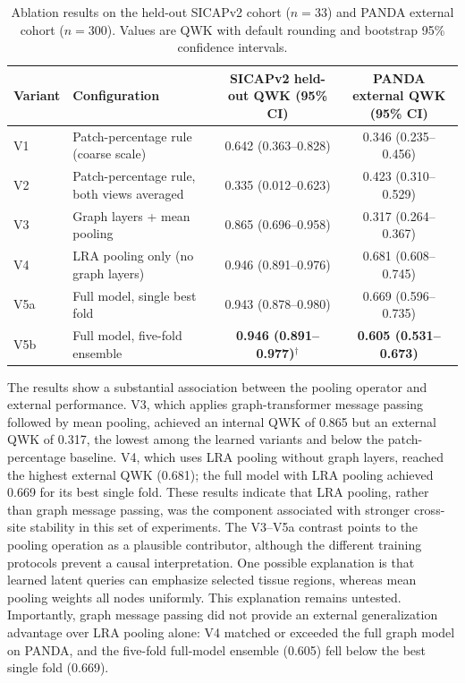 \documentclass[11pt,a4paper]{article}
\begin{document}
\begin{table}[H]
\centering
\small
\renewcommand{\arraystretch}{1.15}
\caption{Ablation results on the held-out SICAPv2 cohort ($n = 33$) and PANDA external cohort ($n = 300$). Values are QWK with default rounding and bootstrap 95\% confidence intervals.}
\label{tab:ablation}
\begin{tabularx}{\textwidth}{lXcc}
\toprule
\textbf{Variant} & \textbf{Configuration} & \textbf{SICAPv2 held-out QWK (95\% CI)} & \textbf{PANDA external QWK (95\% CI)} \\
\midrule
V1 & Patch-percentage rule (coarse scale) & 0.642 (0.363--0.828) & 0.346 (0.235--0.456) \\
V2 & Patch-percentage rule, both views averaged & 0.335 (0.012--0.623) & 0.423 (0.310--0.529) \\
V3 & Graph layers + mean pooling & 0.865 (0.696--0.958) & 0.317 (0.264--0.367) \\
V4 & LRA pooling only (no graph layers) & 0.946 (0.891--0.976) & 0.681 (0.608--0.745) \\
V5a & Full model, single best fold & 0.943 (0.878--0.980) & 0.669 (0.596--0.735) \\
V5b & Full model, five-fold ensemble & \textbf{0.946 (0.891--0.977)}$^\dagger$ & \textbf{0.605 (0.531--0.673)} \\
\bottomrule
\end{tabularx}
\end{table}

The results show a substantial association between the pooling operator and external performance. V3, which applies graph-transformer message passing followed by mean pooling, achieved an internal QWK of 0.865 but an external QWK of 0.317, the lowest among the learned variants and below the patch-percentage baseline. V4, which uses LRA pooling without graph layers, reached the highest external QWK (0.681); the full model with LRA pooling achieved 0.669 for its best single fold. These results indicate that LRA pooling, rather than graph message passing, was the component associated with stronger cross-site stability in this set of experiments. The V3--V5a contrast points to the pooling operation as a plausible contributor, although the different training protocols prevent a causal interpretation. One possible explanation is that learned latent queries can emphasize selected tissue regions, whereas mean pooling weights all nodes uniformly. This explanation remains untested. Importantly, graph message passing did not provide an external generalization advantage over LRA pooling alone: V4 matched or exceeded the full graph model on PANDA, and the five-fold full-model ensemble (0.605) fell below the best single fold (0.669).
\end{document}
